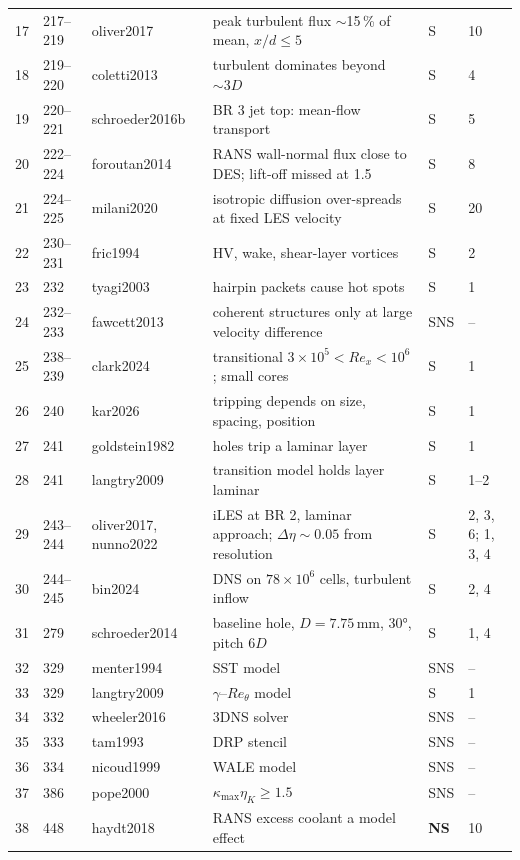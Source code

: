 \documentclass[10pt,a4paper]{article}
\newcommand*{\Reth}{\mathit{Re}_\theta}
\newcommand{\vS}{\textsf{S}}
\newcommand{\vNS}{\textbf{\textsf{NS}}}
\newcommand{\vSNS}{\textsf{SNS}}
\begin{document}
{\begin{longtable}{@{}r P{11mm} P{36mm} P{70mm} P{12mm} P{18mm}@{}}
17 & 217--219 & oliver2017 & peak turbulent flux $\sim$15\,\% of mean, $x/d\le5$ & \vS & 10 \\
18 & 219--220 & coletti2013 & turbulent dominates beyond $\sim3D$ & \vS & 4 \\
19 & 220--221 & schroeder2016b & BR 3 jet top: mean-flow transport & \vS & 5 \\
20 & 222--224 & foroutan2014 & RANS wall-normal flux close to DES; lift-off missed at 1.5 & \vS & 8 \\
21 & 224--225 & milani2020 & isotropic diffusion over-spreads at fixed LES velocity & \vS & 20 \\
22 & 230--231 & fric1994 & HV, wake, shear-layer vortices & \vS & 2 \\
23 & 232 & tyagi2003 & hairpin packets cause hot spots & \vS & 1 \\
24 & 232--233 & fawcett2013 & coherent structures only at large velocity difference & \vSNS & -- \\
25 & 238--239 & clark2024 & transitional $3\times10^5<Re_x<10^6$; small cores & \vS & 1 \\
26 & 240 & kar2026 & tripping depends on size, spacing, position & \vS & 1 \\
27 & 241 & goldstein1982 & holes trip a laminar layer & \vS & 1 \\
28 & 241 & langtry2009 & transition model holds layer laminar & \vS & 1--2 \\
29 & 243--244 & oliver2017, nunno2022 & iLES at BR 2, laminar approach; $\Delta\eta\sim0.05$ from resolution & \vS & 2, 3, 6; 1, 3, 4 \\
30 & 244--245 & bin2024 & DNS on $78\times10^6$ cells, turbulent inflow & \vS & 2, 4 \\
31 & 279 & schroeder2014 & baseline hole, $D=7.75$\,mm, 30°, pitch $6D$ & \vS & 1, 4 \\
32 & 329 & menter1994 & SST model & \vSNS & -- \\
33 & 329 & langtry2009 & $\gamma$--$\Reth$ model & \vS & 1 \\
34 & 332 & wheeler2016 & 3DNS solver & \vSNS & -- \\
35 & 333 & tam1993 & DRP stencil & \vSNS & -- \\
36 & 334 & nicoud1999 & WALE model & \vSNS & -- \\
37 & 386 & pope2000 & $\kappa_{\max}\eta_K\ge1.5$ & \vSNS & -- \\
38 & 448 & haydt2018 & RANS excess coolant a model effect & \vNS & 10 \\

\end{longtable}}
\end{document}
